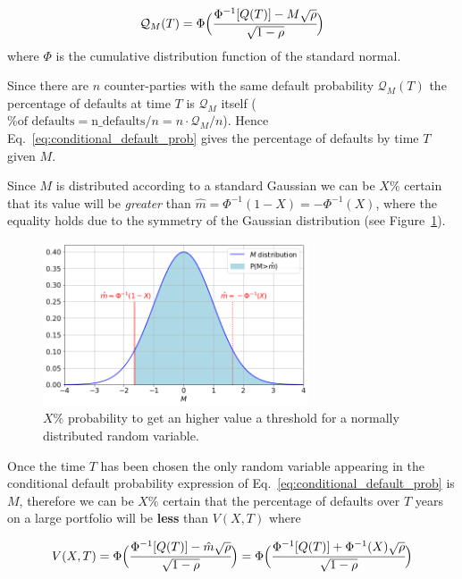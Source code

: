 \begin{equation}
\mathcal{Q}_M(T) = \Phi\Big(\cfrac{\Phi^{-1}[Q(T)]-M\sqrt{\rho}}{\sqrt{1-\rho}}\Big)
\label{eq:conditional_default_prob}
\end{equation}
where $\Phi$ is the cumulative distribution function of the standard normal.

Since there are $n$ counter-parties with the same default probability $\mathcal{Q}_M(T)$ the percentage of defaults at time $T$ is $\mathcal{Q}_M$ itself ($\textrm{\% of defaults} = \textrm{n\_defaults}/n = n\cdot \mathcal{Q}_M/n$). Hence Eq.~\ref{eq:conditional_default_prob} gives the percentage of defaults by time $T$ given $M$. 

Since $M$ is distributed according to a standard Gaussian we can be $X\%$ certain that its value will be \emph{greater} than $\hat{m} = \Phi^{-1}(1-X)=-\Phi^{-1}(X)$, where the equality holds due to the symmetry of the Gaussian distribution (see Figure~\ref{fig:certain_for_X}).

\begin{figure}[htb]
\centering
\includegraphics[width=0.7\textwidth]{figures/certain_for_X}
\caption{$X\%$ probability to get an higher value a threshold for a normally distributed random variable.}
\label{fig:certain_for_X}
\end{figure} 

Once the time $T$ has been chosen the only random variable appearing in the conditional default probability expression of Eq.~\ref{eq:conditional_default_prob} is $M$, therefore we can be $X\%$ certain that the percentage of defaults over $T$ years on a large portfolio will be \textbf{less} than $V(X,T)$ where

\begin{equation*}
V(X,T)= \Phi\Big(\cfrac{\Phi^{-1}[Q(T)]-\hat{m}\sqrt{\rho}}{\sqrt{1-\rho}}\Big) = \Phi\Big(\cfrac{\Phi^{-1}[Q(T)]+\Phi^{-1}(X)\sqrt{\rho}}{\sqrt{1-\rho}}\Big)
\end{equation*}

